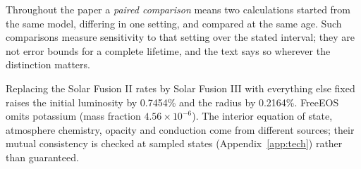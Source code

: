 Throughout the paper a \emph{paired comparison} means two calculations
started from the same model, differing in one setting, and compared at the
same age. Such comparisons measure sensitivity to that setting over the
stated interval; they are not error bounds for a complete lifetime, and the
text says so wherever the distinction matters.

Replacing the Solar Fusion II rates by Solar Fusion III with everything else
fixed raises the initial luminosity by 0.7454\% and the radius by 0.2164\%.
FreeEOS omits potassium (mass fraction $4.56\times10^{-6}$). The interior
equation of state, atmosphere chemistry, opacity and conduction come from
different sources; their mutual consistency is checked at sampled states
(Appendix~\ref{app:tech}) rather than guaranteed.
